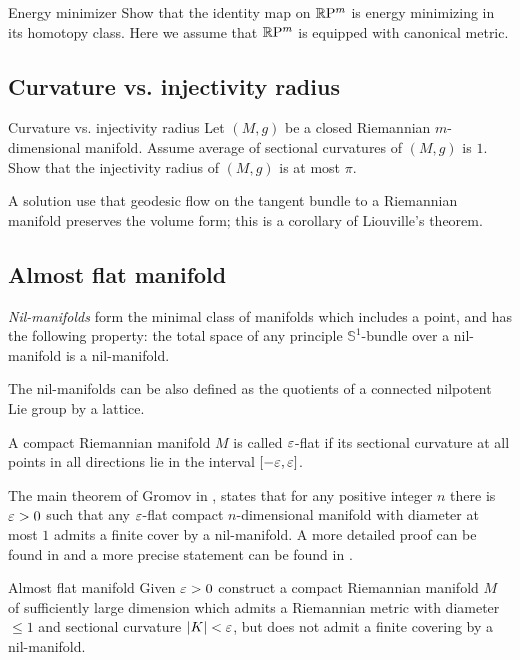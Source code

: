 \begin{pr}{}{Energy minimizer}\label{Energy minimizer}
Show that the identity map on $\mathbb{R}\mathrm{P}^m$ is 
energy
minimizing in its homotopy class.
Here we assume that $\mathbb{R}\mathrm{P}^m$ is equipped with canonical metric.
\end{pr}

\subsection*{Curvature vs. injectivity radius\thm}

\begin{pr}{\thm}{Curvature vs. injectivity radius}\label{scalar-curv} 
Let $(M,g)$ be a closed 
Riemannian $m$-dimensional manifold.
Assume average of sectional curvatures of $(M,g)$ is $1$. 
Show that the injectivity radius of $(M,g)$ is at most $\pi$.
\end{pr}

A solution use that geodesic flow on the tangent bundle to a Riemannian manifold preserves the volume form; this is a corollary of Liouville's theorem.

\subsection*{Almost flat manifold}

\emph{Nil-manifolds} form the minimal class of manifolds which includes a point, and has the following property:  
the total space of any principle $\mathbb{S}^1$-bundle over a nil-manifold is a nil-manifold. 

The nil-manifolds can be also defined as the quotients of a connected nilpotent Lie group by a lattice.

A compact Riemannian manifold $M$ is called $\varepsilon$-flat if its sectional curvature at all points in all directions lie in the interval $[-\varepsilon,\varepsilon]$. 

The main theorem of Gromov in \cite{gromov-almost-flat}, 
states that for any positive integer $n$ there is $\varepsilon>0$ such that any $\varepsilon$-flat compact $n$-dimensional manifold with diameter at most $1$ admits a finite cover by a nil-manifold.
A more detailed proof can be found in \cite{buser-karcher}
and a more precise statement can be found in \cite{ruh}.

\begin{pr}{}{Almost flat manifold}\label{almost-flat}
Given $\varepsilon>0$ construct a compact Riemannian manifold $M$ of sufficiently large dimension which admits a Riemannian metric with diameter $\le 1$ and sectional
curvature $|K|<\varepsilon$,
but does not admit a finite covering by a nil-manifold.
\end{pr}

